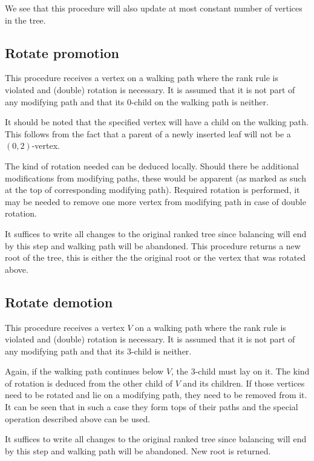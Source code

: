 We see that this procedure will also update at most constant number of vertices in the tree.

\subsection{Rotate promotion}

This procedure receives a vertex on a walking path where the rank rule is violated and (double) rotation is necessary. It is assumed that it is not part of any modifying path and that its $0$-child on the walking path is neither. 

It should be noted that the specified vertex will have a child on the walking path. This follows from the fact that a parent of a newly inserted leaf will not be a $(0,2)$-vertex.

The kind of rotation needed can be deduced locally. Should there be additional modifications from modifying paths, these would be apparent (as marked as such at the top of corresponding modifying path). Required rotation is performed, it may be needed to remove one more vertex from modifying path in case of double rotation.

It suffices to write all changes to the original ranked tree since balancing will end by this step and walking path will be abandoned. 
This procedure returns a new root of the tree, this is either the the original root or the vertex that was rotated above.

\subsection{Rotate demotion}

This procedure receives a vertex $V$ on a walking path where the rank rule is violated and (double) rotation is necessary. It is assumed that it is not part of any modifying path and that its $3$-child is neither. 

Again, if the walking path continues below $V$, the 3-child must lay on it. The kind of rotation is deduced from the other child of $V$ and its children. If those vertices need to be rotated and lie on a modifying path, they need to be removed from it. It can be seen that in such a case they form tops of their paths and the special operation described above can be used.

It suffices to write all changes to the original ranked tree since balancing will end by this step and walking path will be abandoned. New root is returned.

